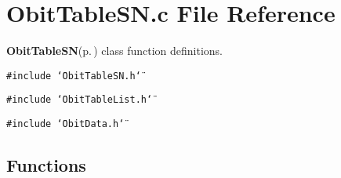 \section{Obit\-Table\-SN.c File Reference}
\label{ObitTableSN_8c}
{\bf Obit\-Table\-SN}{\rm (p.\,\pageref{structObitTableSN})} class function definitions. 

{\tt \#include \char`\"{}Obit\-Table\-SN.h\char`\"{}}\par
{\tt \#include \char`\"{}Obit\-Table\-List.h\char`\"{}}\par
{\tt \#include \char`\"{}Obit\-Data.h\char`\"{}}\par
\subsection*{Functions}

